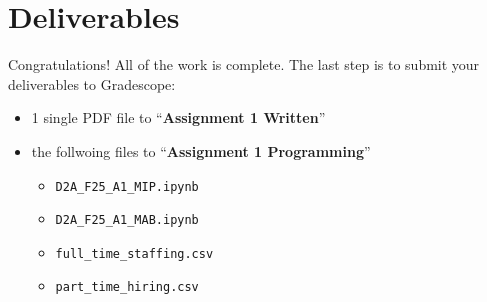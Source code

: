 \documentclass[11pt, letter, answers]{exam}
\begin{document}
\newpage
\section*{Deliverables}
Congratulations! All of the work is complete. The last step is to submit your deliverables to Gradescope:

\begin{itemize}
    \item 1 single PDF file to ``\textbf{Assignment 1 Written}''
    \item the follwoing files to ``\textbf{Assignment 1 Programming}''
    \begin{itemize}
        \item \texttt{D2A\_F25\_A1\_MIP.ipynb}
        \item \texttt{D2A\_F25\_A1\_MAB.ipynb}
        \item \texttt{full\_time\_staffing.csv}
        \item \texttt{part\_time\_hiring.csv}
    \end{itemize}
\end{itemize}
\end{document}
